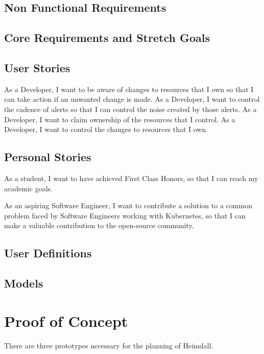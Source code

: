 \documentclass{article}
\begin{document}
\subsection{Non Functional Requirements}



\subsection{Core Requirements and Stretch Goals} \label{stretch-g}



\subsection{User Stories}
As a Developer, I want to be aware of changes to resources that I own so that I can take action if an unwanted change is made.
As a Developer, I want to control the cadence of alerts so that I can control the noise created by those alerts.
As a Developer, I want to claim ownership of the resources that I control.
As a Developer, I want to control the changes to resources that I own.



\subsection{Personal Stories}
As a student, I want to have achieved First Class Honors, so that I can reach my academic goals.

As an aspiring Software Engineer, I want to contribute a solution to a common problem faced by Software Engineers working with Kubernetes, so that I can make a valuable contribution to the open-source community.



\subsection{User Definitions}



\subsection{Models}



\section{Proof of Concept}
There are three prototypes necessary for the planning of Heimdall. 
\end{document}
